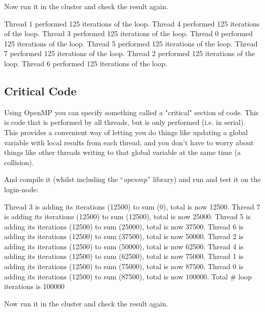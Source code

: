 Now run it in the cluster and check the result again.

\begin{prompt}
Thread 1 performed 125 iterations of the loop.
Thread 4 performed 125 iterations of the loop.
Thread 3 performed 125 iterations of the loop.
Thread 0 performed 125 iterations of the loop.
Thread 5 performed 125 iterations of the loop.
Thread 7 performed 125 iterations of the loop.
Thread 2 performed 125 iterations of the loop.
Thread 6 performed 125 iterations of the loop.
\end{prompt}

\subsection{Critical Code}

Using OpenMP you can specify something called a "critical" section of code.
This is code that is performed by all threads, but is only performed
 (i.e. in serial). This provides a convenient way
of letting you do things like updating a global variable with local results
from each thread, and you don't have to worry about things like other threads
writing to that global variable at the same time (a collision).


And compile it (whilst including the ``\emph{openmp}'' library) and run and test it on the login-node:

\begin{prompt}
Thread 3 is adding its iterations (12500) to sum (0), total is now 12500.
Thread 7 is adding its iterations (12500) to sum (12500), total is now 25000.
Thread 5 is adding its iterations (12500) to sum (25000), total is now 37500.
Thread 6 is adding its iterations (12500) to sum (37500), total is now 50000.
Thread 2 is adding its iterations (12500) to sum (50000), total is now 62500.
Thread 4 is adding its iterations (12500) to sum (62500), total is now 75000.
Thread 1 is adding its iterations (12500) to sum (75000), total is now 87500.
Thread 0 is adding its iterations (12500) to sum (87500), total is now 100000.
Total # loop iterations is 100000
\end{prompt}

Now run it in the cluster and check the result again.

